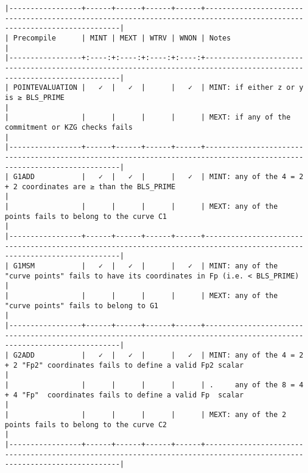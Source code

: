 \documentclass[varwidth=\maxdimen,margin=0.5cm,multi={verbatim}]{standalone}
\begin{document}
\begin{verbatim}
|-----------------+------+------+------+------+------------------------------------------------------------------------------------------------------------------------|
| Precompile      | MINT | MEXT | WTRV | WNON | Notes                                                                                                                  |
|-----------------+:----:+:----:+:----:+:----:+------------------------------------------------------------------------------------------------------------------------|
| POINTEVALUATION |   ✓  |   ✓  |      |   ✓  | MINT: if either z or y is ≥ BLS_PRIME                                                                                  |
|                 |      |      |      |      | MEXT: if any of the commitment or KZG checks fails                                                                     |
|-----------------+------+------+------+------+------------------------------------------------------------------------------------------------------------------------|
| G1ADD           |   ✓  |   ✓  |      |   ✓  | MINT: any of the 4 = 2 + 2 coordinates are ≥ than the BLS_PRIME                                                        |
|                 |      |      |      |      | MEXT: any of the points fails to belong to the curve C1                                                                |
|-----------------+------+------+------+------+------------------------------------------------------------------------------------------------------------------------|
| G1MSM           |   ✓  |   ✓  |      |   ✓  | MINT: any of the "curve points" fails to have its coordinates in Fp (i.e. < BLS_PRIME)                                 |
|                 |      |      |      |      | MEXT: any of the "curve points" fails to belong to G1                                                                  |
|-----------------+------+------+------+------+------------------------------------------------------------------------------------------------------------------------|
| G2ADD           |   ✓  |   ✓  |      |   ✓  | MINT: any of the 4 = 2 + 2 "Fp2" coordinates fails to define a valid Fp2 scalar                                        |
|                 |      |      |      |      | .     any of the 8 = 4 + 4 "Fp"  coordinates fails to define a valid Fp  scalar                                        |
|                 |      |      |      |      | MEXT: any of the 2 points fails to belong to the curve C2                                                              |
|-----------------+------+------+------+------+------------------------------------------------------------------------------------------------------------------------|

\end{verbatim}
\end{document}
